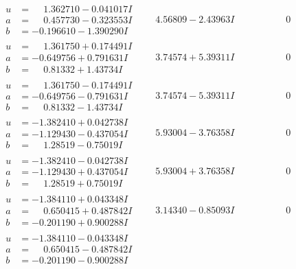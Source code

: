 \documentclass[1p]{elsarticle_modified}
\theoremstyle{definition}
\begin{document}
$$\begin{array}{c|c|c}
\begin{aligned}
u &= \phantom{-}1.362710 - 0.041017 I \\
a &= \phantom{-}0.457730 - 0.323553 I \\
b &= -0.196610 - 1.390290 I\end{aligned}
 & \phantom{-}4.56809 - 2.43963 I & \phantom{-0.000000 } 0 \\ \hline\begin{aligned}
u &= \phantom{-}1.361750 + 0.174491 I \\
a &= -0.649756 + 0.791631 I \\
b &= \phantom{-}0.81332 + 1.43734 I\end{aligned}
 & \phantom{-}3.74574 + 5.39311 I & \phantom{-0.000000 } 0 \\ \hline\begin{aligned}
u &= \phantom{-}1.361750 - 0.174491 I \\
a &= -0.649756 - 0.791631 I \\
b &= \phantom{-}0.81332 - 1.43734 I\end{aligned}
 & \phantom{-}3.74574 - 5.39311 I & \phantom{-0.000000 } 0 \\ \hline\begin{aligned}
u &= -1.382410 + 0.042738 I \\
a &= -1.129430 - 0.437054 I \\
b &= \phantom{-}1.28519 - 0.75019 I\end{aligned}
 & \phantom{-}5.93004 - 3.76358 I & \phantom{-0.000000 } 0 \\ \hline\begin{aligned}
u &= -1.382410 - 0.042738 I \\
a &= -1.129430 + 0.437054 I \\
b &= \phantom{-}1.28519 + 0.75019 I\end{aligned}
 & \phantom{-}5.93004 + 3.76358 I & \phantom{-0.000000 } 0 \\ \hline\begin{aligned}
u &= -1.384110 + 0.043348 I \\
a &= \phantom{-}0.650415 + 0.487842 I \\
b &= -0.201190 + 0.900288 I\end{aligned}
 & \phantom{-}3.14340 - 0.85093 I & \phantom{-0.000000 } 0 \\ \hline\begin{aligned}
u &= -1.384110 - 0.043348 I \\
a &= \phantom{-}0.650415 - 0.487842 I \\
b &= -0.201190 - 0.900288 I\end{aligned}

\end{array}$$
\end{document}
